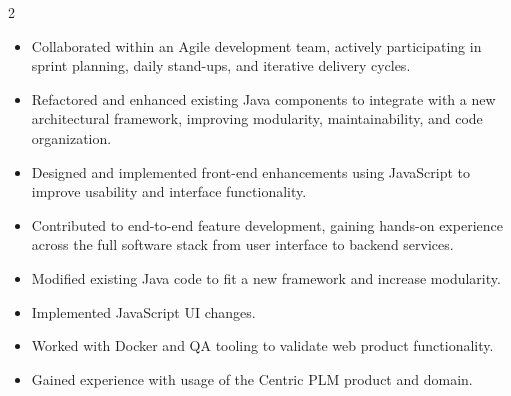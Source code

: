 \documentclass[10pt,a4paper,withhyper]{altacv}
\begin{document}
\begin{paracol}{2}
\begin{itemize}
\item Collaborated within an Agile development team, actively participating in sprint planning, daily stand-ups, and iterative delivery cycles.
\item Refactored and enhanced existing Java components to integrate with a new architectural framework, improving modularity, maintainability, and code organization.
\item Designed and implemented front-end enhancements using JavaScript to improve usability and interface functionality.
\item Contributed to end-to-end feature development, gaining hands-on experience across the full software stack from user interface to backend services.
\item Modified existing Java code to fit a new framework and increase modularity.
\item Implemented JavaScript UI changes.
\end{itemize}

\divider

\begin{itemize}
\item Worked with Docker and QA tooling to validate web product functionality.
\item Gained experience with usage of the Centric PLM product and domain.
\end{itemize}


\end{paracol}
\end{document}
